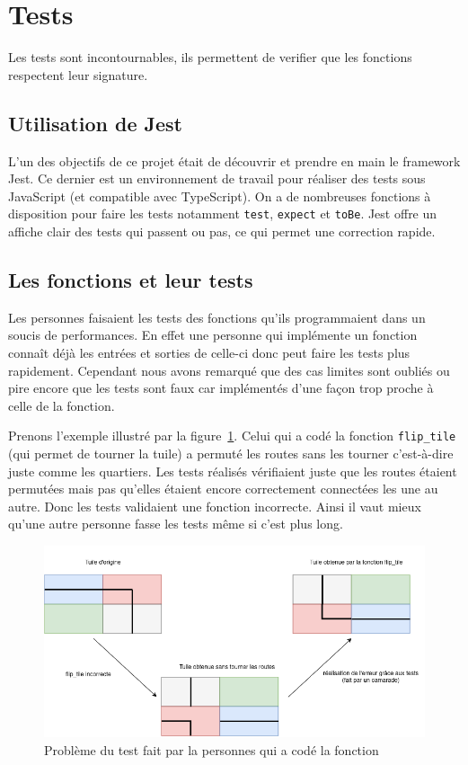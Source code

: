 \section{Tests}
Les tests sont incontournables, ils permettent de verifier que les fonctions respectent leur signature.

\subsection{Utilisation de Jest}
L'un des objectifs de ce projet était de découvrir et prendre en main le framework Jest. Ce dernier est un environnement de travail pour réaliser des tests sous JavaScript (et compatible avec TypeScript). On a de nombreuses fonctions à disposition pour faire les tests notamment \texttt{test}, \texttt{expect} et \texttt{toBe}. Jest offre un affiche clair des tests qui passent ou pas, ce qui permet une correction rapide.

\subsection{Les fonctions et leur tests}
Les personnes faisaient les tests des fonctions qu'ils programmaient dans un soucis de performances. En effet une personne qui implémente un fonction connaît déjà les entrées et sorties de celle-ci donc peut faire les tests plus rapidement. Cependant nous avons remarqué que des cas limites sont oubliés ou pire encore que les tests sont faux car implémentés d'une façon trop proche à celle de la fonction.

Prenons l'exemple illustré par la figure~\ref{fig:ex_autre_tests}. Celui qui a codé la fonction \texttt{flip\_tile} (qui permet de tourner la tuile) a permuté les routes sans les tourner c'est-à-dire juste comme les quartiers. Les tests réalisés vérifiaient juste que les routes étaient permutées mais pas qu'elles étaient encore correctement connectées les une au autre. Donc les tests validaient une fonction incorrecte. Ainsi il vaut mieux qu'une autre personne fasse les tests même si c'est plus long.

\begin{figure}[H]
    \centering
    \includegraphics[width=0.8\linewidth]{images/tests/autre_fait_test.png}
    \caption{Problème du test fait par la personnes qui a codé la fonction}
    \label{fig:ex_autre_tests}
\end{figure}


